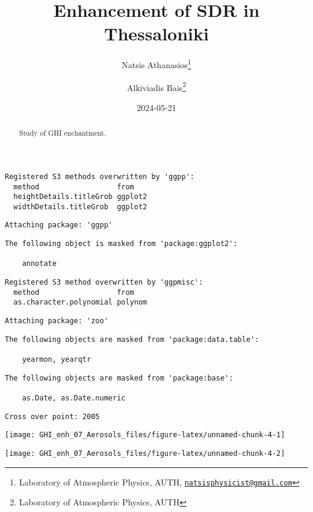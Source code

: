 \documentclass[
  10pt,
  a4paper,oneside]{article}
\title{Enhancement of SDR in Thessaloniki}
\author{Natsis Athanasios\footnote{Laboratory of Atmospheric Physics, AUTH, \href{mailto:natsisphysicist@gmail.com}{\nolinkurl{natsisphysicist@gmail.com}}} \and Alkiviadis Bais\footnote{Laboratory of Atmospheric Physics, AUTH}}
\date{2024-05-21}
\begin{document}
\maketitle
\begin{abstract}
Study of GHI enchantment.
\end{abstract}

{
\hypersetup{linkcolor=}
\setcounter{tocdepth}{4}
\tableofcontents
}
\begin{verbatim}
Registered S3 methods overwritten by 'ggpp':
  method                  from   
  heightDetails.titleGrob ggplot2
  widthDetails.titleGrob  ggplot2
\end{verbatim}

\begin{verbatim}
Attaching package: 'ggpp'
\end{verbatim}

\begin{verbatim}
The following object is masked from 'package:ggplot2':

    annotate
\end{verbatim}

\begin{verbatim}
Registered S3 method overwritten by 'ggpmisc':
  method                  from   
  as.character.polynomial polynom
\end{verbatim}

\begin{verbatim}
Attaching package: 'zoo'
\end{verbatim}

\begin{verbatim}
The following objects are masked from 'package:data.table':

    yearmon, yearqtr
\end{verbatim}

\begin{verbatim}
The following objects are masked from 'package:base':

    as.Date, as.Date.numeric
\end{verbatim}

\begin{verbatim}
Cross over point: 2005 
\end{verbatim}

\begin{center}\texttt{[image: GHI\_enh\_07\_Aerosols\_files/figure-latex/unnamed-chunk-4-1]} \end{center}

\begin{center}\texttt{[image: GHI\_enh\_07\_Aerosols\_files/figure-latex/unnamed-chunk-4-2]} \end{center}
\end{document}

